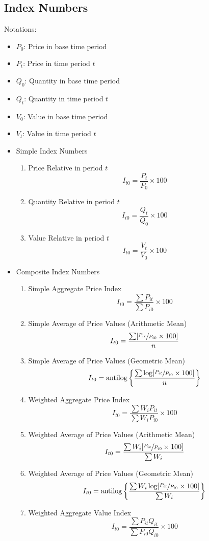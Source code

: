 \documentclass[
10pt, %
a4paper, %
]{report}
\begin{document}
\subsection*{Index Numbers}
Notations:
\begin{itemize}
\item \(P_0\): Price in base time period
\item \(P_t\): Price in time period \(t\)
\item \(Q_0\): Quantity in base time period
\item \(Q_t\): Quantity in time period \(t\)
\item \(V_0\): Value in base time period
\item \(V_t\): Value in time period \(t\)
\end{itemize}
\begin{itemize}
\item Simple Index Numbers
\begin{enumerate}
\item Price Relative in period \(t\) \[I_{t0} = \frac{P_t}{P_0} \times 100\]
\item Quantity Relative in period \(t\) \[I_{t0} = \frac{Q_t}{Q_0} \times 100\]
\item Value Relative in period \(t\) \[I_{t0} = \frac{V_t}{V_0} \times 100\]
\end{enumerate}
\item Composite Index Numbers
\begin{enumerate}
\item Simple Aggregate Price Index \[I_{t0} = \frac{\sum P_{it}}{\sum P_{i0}} \times 100\]
\item Simple Average of Price Values (Arithmetic Mean) \[I_{t0} = \frac{\sum [\sfrac{P_{it}}{P_{i0}} \times 100]}{n}\]
\item Simple Average of Price Values (Geometric Mean) \[I_{t0} = \text{antilog} \left\{\frac{\sum \log [\sfrac{P_{it}}{P_{i0}} \times 100]}{n}\right\}\]
\item Weighted Aggregate Price Index \[I_{t0} = \frac{\sum W_i P_{it}}{\sum W_i P_{i0}} \times 100\]
\item Weighted Average of Price Values (Arithmetic Mean) \[I_{t0} = \frac{\sum W_i [\sfrac{P_{it}}{P_{i0}} \times 100]}{\sum W_i}\]
\item Weighted Average of Price Values (Geometric Mean) \[I_{t0} = \text{antilog} \left\{\frac{\sum W_i \log [\sfrac{P_{it}}{P_{i0}} \times 100]}{\sum W_i}\right\}\]
\item Weighted Aggregate Value Index \[I_{t0} = \frac{\sum P_{it} Q_{it}}{\sum P_{i0} Q_{i0}} \times 100\]

\end{enumerate}
\end{itemize}
\end{document}
